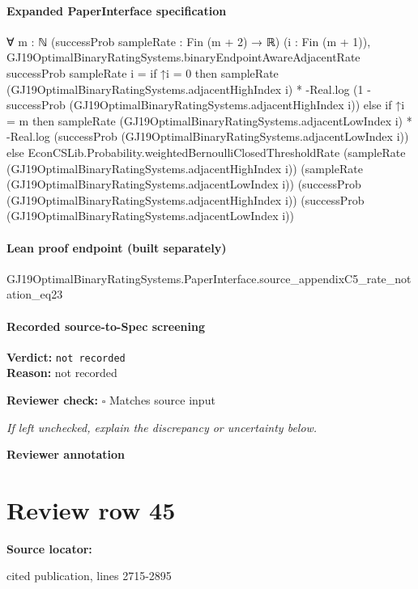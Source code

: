 \documentclass[10pt]{article}
\newcommand{\reviewerbox}{%
  \par\noindent\fbox{\parbox{0.96\linewidth}{\rule{0pt}{0.38in}}}\par
}
\newcommand{\reviewmatch}[1]{%
  \par\noindent\textbf{Reviewer check:} $\square$\; #1\par
  \noindent\emph{If left unchecked, explain the discrepancy or uncertainty below.}\par
}
\begin{document}
\paragraph{Expanded PaperInterface specification}
\begin{ReviewVerbatim}
∀ {m : ℕ} (successProb sampleRate : Fin (m + 2) → ℝ) (i : Fin (m + 1)),
  GJ19OptimalBinaryRatingSystems.binaryEndpointAwareAdjacentRate successProb sampleRate i =
    if ↑i = 0 then
      sampleRate (GJ19OptimalBinaryRatingSystems.adjacentHighIndex i) *
        -Real.log (1 - successProb (GJ19OptimalBinaryRatingSystems.adjacentHighIndex i))
    else
      if ↑i = m then
        sampleRate (GJ19OptimalBinaryRatingSystems.adjacentLowIndex i) *
          -Real.log (successProb (GJ19OptimalBinaryRatingSystems.adjacentLowIndex i))
      else
        EconCSLib.Probability.weightedBernoulliClosedThresholdRate
          (sampleRate (GJ19OptimalBinaryRatingSystems.adjacentHighIndex i))
          (sampleRate (GJ19OptimalBinaryRatingSystems.adjacentLowIndex i))
          (successProb (GJ19OptimalBinaryRatingSystems.adjacentHighIndex i))
          (successProb (GJ19OptimalBinaryRatingSystems.adjacentLowIndex i))
\end{ReviewVerbatim}

\paragraph{Lean proof endpoint (built separately)}\begin{ReviewVerbatim}
GJ19OptimalBinaryRatingSystems.PaperInterface.source_appendixC5_rate_notation_eq23
\end{ReviewVerbatim}

\paragraph{Recorded source-to-Spec screening}
\textbf{Verdict:} \texttt{not recorded}
\\
\textbf{Reason:} not recorded
\reviewmatch{Matches source input}
\noindent\textbf{Reviewer annotation}\par
\reviewerbox
\clearpage
\hypertarget{source-claim-f8aedb48228e5085}{}
\section*{Review row 45}
\textbf{Source locator:} {\footnotesize\raggedright cited publication, lines 2715-\allowbreak{}2895\par}
\end{document}
